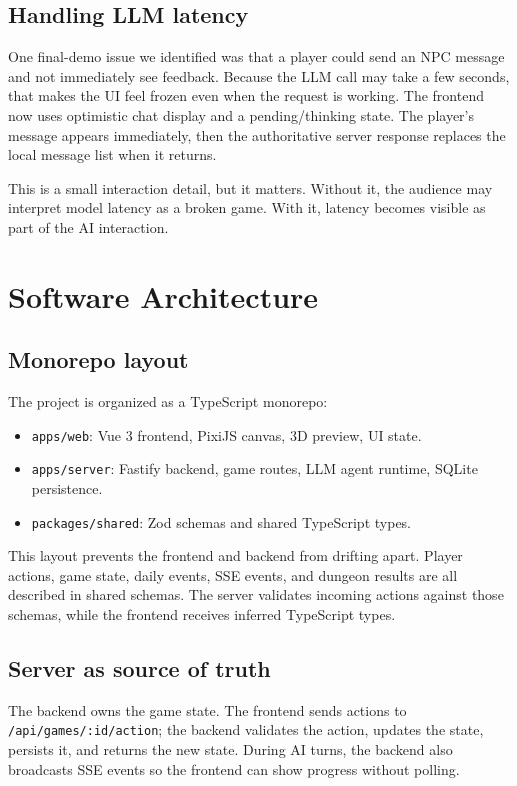 \documentclass[11pt]{article}
\begin{document}
\subsection{Handling LLM latency}

One final-demo issue we identified was that a player could send an NPC message
and not immediately see feedback. Because the LLM call may take a few seconds,
that makes the UI feel frozen even when the request is working. The frontend now
uses optimistic chat display and a pending/thinking state. The player's message
appears immediately, then the authoritative server response replaces the local
message list when it returns.

This is a small interaction detail, but it matters. Without it, the audience may
interpret model latency as a broken game. With it, latency becomes visible as
part of the AI interaction.

\section{Software Architecture}

\subsection{Monorepo layout}

The project is organized as a TypeScript monorepo:

\begin{itemize}
  \item \texttt{apps/web}: Vue 3 frontend, PixiJS canvas, 3D preview, UI state.
  \item \texttt{apps/server}: Fastify backend, game routes, LLM agent runtime,
  SQLite persistence.
  \item \texttt{packages/shared}: Zod schemas and shared TypeScript types.
\end{itemize}

This layout prevents the frontend and backend from drifting apart. Player
actions, game state, daily events, SSE events, and dungeon results are all
described in shared schemas. The server validates incoming actions against those
schemas, while the frontend receives inferred TypeScript types.

\subsection{Server as source of truth}

The backend owns the game state. The frontend sends actions to
\texttt{/api/games/:id/action}; the backend validates the action, updates the
state, persists it, and returns the new state. During AI turns, the backend also
broadcasts SSE events so the frontend can show progress without polling.
\end{document}
